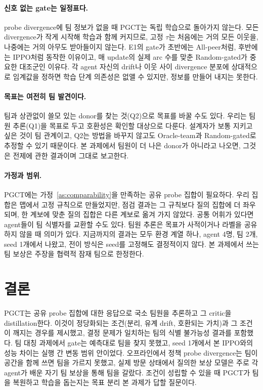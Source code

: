 \documentclass[twocolumn,10pt]{article}
\theoremstyle{remark}
\newcommand{\ours}{PGCT}
\begin{document}
\paragraph{신호 없는 gate는 일정표다.} probe divergence에 팀 정보가 없을 때 \ours{}는 독립 학습으로 돌아가지 않는다. 모든
divergence가 작게 시작해 학습과 함께 커지므로, 고정 $\tau$는 처음에는 거의 모든 이웃을, 나중에는 거의 아무도 받아들이지 않는다.
E1의 gate가 초반에는 All-peer처럼, 후반에는 IPPO처럼 동작한 이유이고, 매 update의 실제 arc 수를 맞춘 Random-gated가 중요한
대조군인 이유다. 각 agent 자신의 drift나 이웃 사이 divergence 분포에 상대적으로 임계값을 정하면 학습 단계 의존성은 없앨 수 있지만,
정보를 만들어 내지는 못한다.

\paragraph{목표는 여전히 팀 발견이다.} 팀과 상관없이 쓸모 있는 donor를 찾는 것(Q2)으로 목표를 바꿀 수도 있다. 우리는 팀원
추론(Q1)을 목표로 두고 호환성은 확인할 대상으로 다룬다. 설계자가 보통 지키고 싶은 것이 팀 관계이고, Q2는 방법을 바꾸지 않고도
Oracle-team과 Random-gated로 추정할 수 있기 때문이다. 본 과제에서 팀원이 더 나은 donor가 아니라고 나오면, 그것은 전제에 관한
결과이며 그대로 보고한다.

\paragraph{가정과 범위.} \ours{}에는 가정~\ref{as:comparability}을 만족하는 공유 probe 집합이 필요하다. 우리 집합은 맵에서 고정
규칙으로 만들었지만, 점검 결과는 그 규칙보다 질의 집합에 더 좌우되며, 한 계보에 맞춘 질의 집합은 다른 계보로 옮겨 가지 않았다.
공통 어휘가 있다면 agent들이 팀 식별자를 교환할 수도 있다. 팀원 추론은 목표가 사적이거나 라벨을 공유하지 않을 때 의미가 있다.
지금까지의 결과는 모두 환경 계열 하나, agent 4명, 팀 2개, seed 1개에서 나왔고, 전이 방식은 seed를 고정해도 결정적이지 않다. 본
과제에서 쓰는 팀 보상은 주장을 협력적 잠재 팀으로 한정한다.

\section{결론}
\ours{}는 공유 probe 집합에 대한 응답으로 국소 팀원을 추론하고 그 critic을 distillation한다. 이것이 정당화되는 조건(분리, 유계
drift, 호환되는 가치)과 그 조건이 깨지는 경우를 제시했고, 결정 문제가 일치하는 팀의 식별 불가능성 결과를 포함했다. 팀 대칭
과제에서 gate는 예측대로 팀을 찾지 못했고, seed 1개에서 본 IPPO와의 성능 차이는 실행 간 변동 범위 안이었다. 오프라인에서 정책
probe divergence는 팀이 공간을 함께 쓰면 팀을 가르지 못했고, 실제 방문 상태에서 질의한 보상 모델은 주로 각 agent가 배운 자기 팀
보상을 통해 팀을 갈랐다. 조건이 성립할 수 있을 때 \ours{}가 팀을 복원하고 학습을 돕는지는 목표 분리 본 과제가 답할 질문이다.
\end{document}
